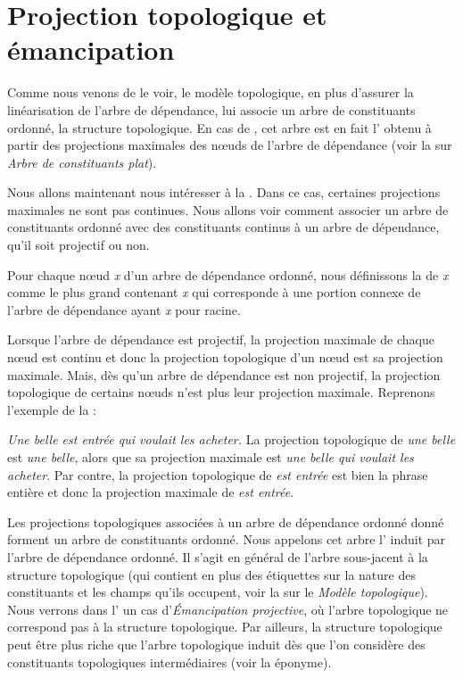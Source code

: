 \section{Projection topologique et émancipation}\label{sec:3.5.30}

Comme nous venons de le voir, le modèle topologique, en plus d’assurer la linéarisation de l’arbre de dépendance, lui associe un arbre de constituants ordonné, la structure topologique. En cas de , cet arbre est en fait l’ obtenu à partir des projections maximales des nœuds de l’arbre de dépendance (voir la  sur \textit{Arbre de constituants plat}).

Nous allons maintenant nous intéresser à la . Dans ce cas, certaines projections maximales ne sont pas continues. Nous allons voir comment associer un arbre de constituants ordonné avec des constituants continus à un arbre de dépendance, qu’il soit projectif ou non.

{Pour chaque nœud \textit{x} d’un arbre de dépendance ordonné, nous définissons la  de \textit{x} comme le plus grand  contenant \textit{x} qui corresponde à une portion connexe de l’arbre de dépendance ayant \textit{x} pour racine.}

Lorsque l’arbre de dépendance est projectif, la projection maximale de chaque nœud est continu et donc la projection topologique d’un nœud est sa projection maximale. Mais, dès qu’un arbre de dépendance est non projectif, la projection topologique de certains nœuds n’est plus leur projection maximale. Reprenons l’exemple  de la  :

\ea\label{ex:belle}
    \textit{{Une belle est entrée qui voulait les acheter}.}
\z
La projection topologique de \textit{une belle} est \textit{une belle}, alors que sa projection maximale est \textit{une belle qui voulait les acheter}. Par contre, la projection topologique de \textit{est entrée} est bien la phrase entière et donc la projection maximale de \textit{est entrée}.

Les projections topologiques associées à un arbre de dépendance ordonné don\-né forment un arbre de constituants ordonné. Nous appelons cet arbre l’ induit par l’arbre de dépendance ordonné. Il s'agit en général de l'arbre sous-jacent à la structure topologique (qui contient en plus des étiquettes sur la nature des constituants et les champs qu'ils occupent, voir la  sur le {\textit{Modèle topologique}}). Nous verrons dans l' un cas d'\textit{Émanci\-pa\-tion projective}, où l'arbre topologique ne correspond pas à la structure topologique. Par ailleurs, la structure topologique peut être plus riche que l'arbre topologique induit dès que l'on considère des constituants topologiques intermédiaires (voir la  éponyme).

